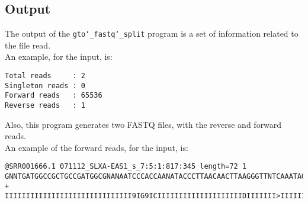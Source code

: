 \subsection*{Output}
The output of the \texttt{gto\char`_fastq\char`_split} program is a set of information related to the file read.\\
An example, for the input, is:
\begin{lstlisting}
Total reads     : 2
Singleton reads : 0
Forward reads   : 65536
Reverse reads   : 1
\end{lstlisting}
Also, this program generates two FASTQ files, with the reverse and forward reads.\\
An example of the forward reads, for the input, is: 
\begin{lstlisting}
@SRR001666.1 071112_SLXA-EAS1_s_7:5:1:817:345 length=72 1
GNNTGATGGCCGCTGCCGATGGCGNANAATCCCACCAANATACCCTTAACAACTTAAGGGTTNTCAAATAGA
+
IIIIIIIIIIIIIIIIIIIIIIIIIIIIII9IG9ICIIIIIIIIIIIIIIIIIIIIDIIIIIII>IIIIII/
\end{lstlisting}
